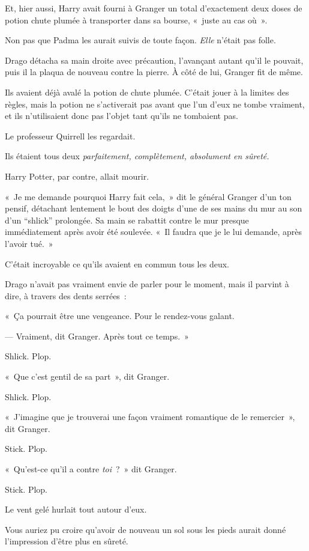 Et, hier aussi, Harry avait fourni à Granger un total d'exactement deux doses de potion chute plumée à transporter dans sa bourse, «~juste au cas où~».

Non pas que Padma les aurait suivis de toute façon.
\emph{Elle} n'était pas folle.

Drago détacha sa main droite avec précaution, l'avançant autant qu'il le pouvait, puis il la plaqua de nouveau contre la pierre.
À côté de lui, Granger fit de même.

Ils avaient déjà avalé la potion de chute plumée.
C'était jouer à la limites des règles, mais la potion ne s'activerait pas avant que l'un d'eux ne tombe vraiment, et ils n'utilisaient donc pas l'objet tant qu'ils ne tombaient pas.

Le professeur Quirrell les regardait.

Ils étaient tous deux \emph{parfaitement, complètement, absolument en sûreté.}

Harry Potter, par contre, allait mourir.

«~Je me demande pourquoi Harry fait cela,~» dit le général Granger d'un ton pensif, détachant lentement le bout des doigts d'une de ses mains du mur au son d'un “shlick” prolongée.
Sa main se rabattit contre le mur presque immédiatement après avoir été soulevée.
«~Il faudra que je le lui demande, après l'avoir tué.~»

C'était incroyable ce qu'ils avaient en commun tous les deux.

Drago n'avait pas vraiment envie de parler pour le moment, mais il parvint à dire, à travers des dents serrées~:

«~Ça pourrait être une vengeance.
Pour le rendez-vous galant.

--- Vraiment, dit Granger.
Après tout ce temps.~»

Shlick. Plop.

«~Que c'est gentil de sa part~», dit Granger.

Shlick. Plop.

«~J'imagine que je trouverai une façon vraiment romantique de le remercier~», dit Granger.

Stick. Plop.

«~Qu'est-ce qu'il a contre \emph{toi}~?~»
dit Granger.

Stick. Plop.

Le vent gelé hurlait tout autour d'eux.

\later

Vous auriez pu croire qu'avoir de nouveau un sol sous les pieds aurait donné l'impression d'être plus en sûreté.

